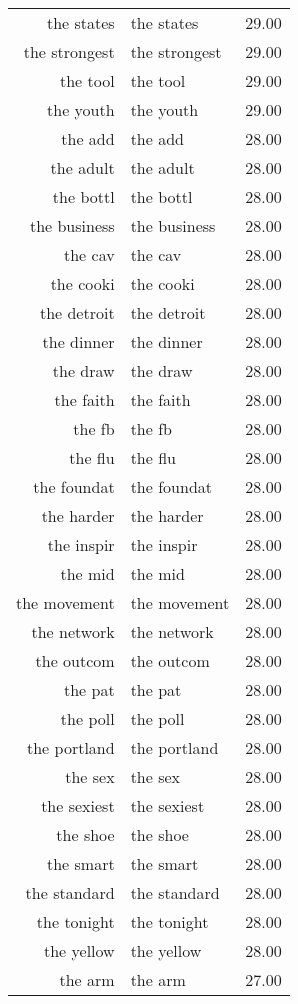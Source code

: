 \begin{table}[ht]
\begin{tabular}{rlr}
  the states & the states & 29.00 \\ 
  the strongest & the strongest & 29.00 \\ 
  the tool & the tool & 29.00 \\ 
  the youth & the youth & 29.00 \\ 
  the add & the add & 28.00 \\ 
  the adult & the adult & 28.00 \\ 
  the bottl & the bottl & 28.00 \\ 
  the business & the business & 28.00 \\ 
  the cav & the cav & 28.00 \\ 
  the cooki & the cooki & 28.00 \\ 
  the detroit & the detroit & 28.00 \\ 
  the dinner & the dinner & 28.00 \\ 
  the draw & the draw & 28.00 \\ 
  the faith & the faith & 28.00 \\ 
  the fb & the fb & 28.00 \\ 
  the flu & the flu & 28.00 \\ 
  the foundat & the foundat & 28.00 \\ 
  the harder & the harder & 28.00 \\ 
  the inspir & the inspir & 28.00 \\ 
  the mid & the mid & 28.00 \\ 
  the movement & the movement & 28.00 \\ 
  the network & the network & 28.00 \\ 
  the outcom & the outcom & 28.00 \\ 
  the pat & the pat & 28.00 \\ 
  the poll & the poll & 28.00 \\ 
  the portland & the portland & 28.00 \\ 
  the sex & the sex & 28.00 \\ 
  the sexiest & the sexiest & 28.00 \\ 
  the shoe & the shoe & 28.00 \\ 
  the smart & the smart & 28.00 \\ 
  the standard & the standard & 28.00 \\ 
  the tonight & the tonight & 28.00 \\ 
  the yellow & the yellow & 28.00 \\ 
  the arm & the arm & 27.00 \\ 

\end{tabular}
\end{table}

